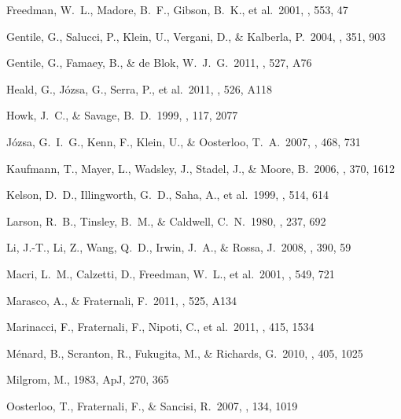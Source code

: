\documentclass[traditabstract]{aa}
\begin{document}
\begin{thebibliography}{}
 Freedman, W.~L., 
Madore, B.~F., Gibson, B.~K., et al.\ 2001, \apj, 553, 47 

 Gentile, G., Salucci, 
P., Klein, U., Vergani, D., \& Kalberla, P.\ 2004, \mnras, 351, 903 

 Gentile, G., Famaey, B., \& de Blok, W.~J.~G.\ 2011, \aap, 527, A76 

 Heald, G., J{\'o}zsa, G., Serra, P., et al.\ 2011, \aap, 526, A118

 Howk, J.~C., \& Savage, B.~D.\ 1999, \aj, 117, 2077 

 J{\'o}zsa, G.~I.~G., Kenn, F., Klein, U., \& Oosterloo, T.~A.\ 2007, \aap, 468, 731 

 Kaufmann, T., Mayer, 
L., Wadsley, J., Stadel, J., \& Moore, B.\ 2006, \mnras, 370, 1612 

 Kelson, D.~D., 
Illingworth, G.~D., Saha, A., et al.\ 1999, \apj, 514, 614 

 Larson, R.~B., Tinsley, 
B.~M., \& Caldwell, C.~N.\ 1980, \apj, 237, 692 

 Li, J.-T., Li, Z., Wang, 
Q.~D., Irwin, J.~A., \& Rossa, J.\ 2008, \mnras, 390, 59 

 Macri, L.~M., Calzetti, 
D., Freedman, W.~L., et al.\ 2001, \apj, 549, 721 

 Marasco, A., \& Fraternali, F.\ 2011, \aap, 525, A134 

 Marinacci, F., 
Fraternali, F., Nipoti, C., et al.\ 2011, \mnras, 415, 1534 

 M{\'e}nard, B., 
Scranton, R., Fukugita, M., \& Richards, G.\ 2010, \mnras, 405, 1025 

 Milgrom, M., 1983, ApJ, 270, 365

 Oosterloo, T., 
Fraternali, F., \& Sancisi, R.\ 2007, \aj, 134, 1019 


\end{thebibliography}
\end{document}
